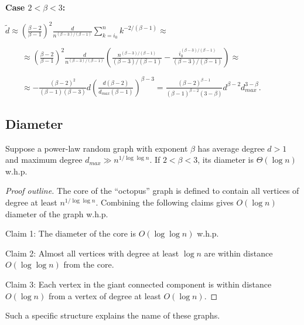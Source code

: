 \textbf{Case $2<\beta<3$:}

$\tilde{d}\approx\left(\frac{\beta-2}{\beta-1}\right)^2\frac{d}{n^{(\beta-3)/(\beta-1)}}
\sum_{k=i_0}^{n}{k^{-2/(\beta-1)}}\approx$

$\qquad\approx\left(\frac{\beta-2}{\beta-1}\right)^2\frac{d}{n^{(\beta-3)/(\beta-1)}}
\left(\frac{n^{(\beta-3)/(\beta-1)}}{(\beta-3)/(\beta-1)}
    -\frac{i_0^{(\beta-3)/(\beta-1)}}{(\beta-3)/(\beta-1)}
\right)\approx$

$\qquad\approx-\frac{(\beta-2)^2}{(\beta-1)(\beta-3)}d
\left(\frac{d(\beta-2)}{d_{max}(\beta-1)}\right)^{\beta-3}
=\frac{(\beta-2)^{\beta-1}}{(\beta-1)^{\beta-2}(3-\beta)}
d^{\beta-2}d_{max}^{3-\beta}$.

\subsection{Diameter}

\begin{theorem}
    Suppose a power-law random graph with exponent $\beta$ has average degree $d>1$
    and maximum degree $d_{max}\gg n^{1/\log\log n}$.
    If $2<\beta<3$, its diameter is $\Theta(\log n)$ w.h.p.
\end{theorem}

\begin{proof}[Proof outline]
    The core of the ``octopus'' graph is defined to contain all vertices of degree
    at least $n^{1/\log\log n}$.
    Combining the following claims gives $O(\log n)$ diameter of the graph w.h.p.
    
    Claim 1: The diameter of the core is $O(\log\log n)$ w.h.p.
    
    Claim 2: Almost all vertices with degree at least $\log n$ are
    within distance $O(\log\log n)$ from the core.
    
    Claim 3: Each vertex in the giant connected component is within distance
    $O(\log n)$ from a vertex of degree at least $O(\log n)$.
\end{proof}

Such a specific structure explains the name of these graphs.

%
%

